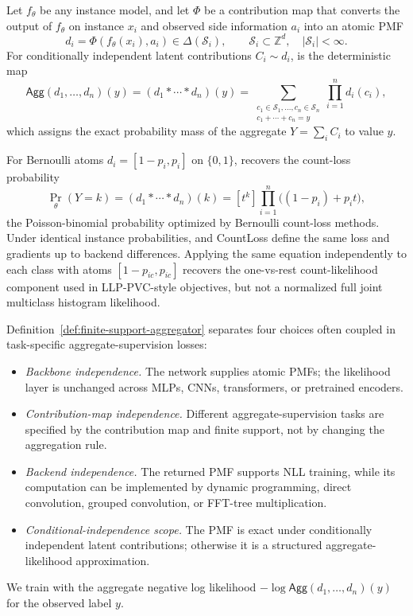 \begin{definition}
\label{def:finite-support-aggregator}
Let $f_\theta$ be any instance model, and let $\Phi$ be a contribution map that converts the output of $f_\theta$ on instance $x_i$ and observed side information $a_i$ into an atomic PMF
\begin{equation}
  d_i = \Phi(f_\theta(x_i),a_i) \in \Delta(\mathcal{S}_i),
  \qquad
  \mathcal{S}_i \subset \mathbb{Z}^d,\quad |\mathcal{S}_i|<\infty .
\end{equation}
For conditionally independent latent contributions $C_i\sim d_i$, \method{} is the deterministic map
\begin{equation}
  \mathsf{Agg}(d_1,\ldots,d_n)(y)
  =
  (d_1 * \cdots * d_n)(y)
  =
  \sum_{\substack{c_1\in\mathcal{S}_1,\ldots,c_n\in\mathcal{S}_n\\
                  c_1+\cdots+c_n=y}}
  \prod_{i=1}^n d_i(c_i),
  \label{eq:finite-support-aggregator}
\end{equation}
which assigns the exact probability mass of the aggregate $Y=\sum_i C_i$ to value $y$.
\end{definition}

For Bernoulli atoms $d_i=[1-p_i,p_i]$ on $\{0,1\}$, \method{} recovers the count-loss probability
\begin{equation}
  \Pr_\theta(Y=k)=(d_1*\cdots*d_n)(k)=
  [t^k]\prod_{i=1}^n \bigl((1-p_i)+p_it\bigr),
\end{equation}
the Poisson-binomial probability optimized by Bernoulli count-loss methods.
Under identical instance probabilities, \method{} and CountLoss define the same loss and gradients up to backend differences.
Applying the same equation independently to each class with atoms $[1-p_{ic},p_{ic}]$ recovers the one-vs-rest count-likelihood component used in LLP-PVC-style objectives, but not a normalized full joint multiclass histogram likelihood.

Definition~\ref{def:finite-support-aggregator} separates four choices often coupled in task-specific aggregate-supervision losses:
\begin{itemize}
  \item \emph{Backbone independence.}  The network supplies atomic PMFs; the likelihood layer is unchanged across MLPs, CNNs, transformers, or pretrained encoders.
  \item \emph{Contribution-map independence.}  Different aggregate-supervision tasks are specified by the contribution map and finite support, not by changing the aggregation rule.
  \item \emph{Backend independence.}  The returned PMF supports NLL training, while its computation can be implemented by dynamic programming, direct convolution, grouped convolution, or FFT-tree multiplication.
  \item \emph{Conditional-independence scope.}  The PMF is exact under conditionally independent latent contributions; otherwise it is a structured aggregate-likelihood approximation.
\end{itemize}
We train with the aggregate negative log likelihood $-\log \mathsf{Agg}(d_1,\ldots,d_n)(y)$ for the observed label $y$.


